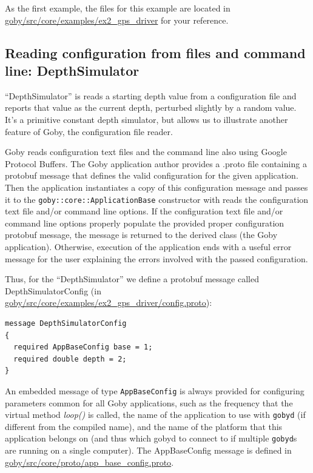 \documentclass[11pt, letterpaper]{article}
\begin{document}
As the first example, the files for this example are located in \href{http://bazaar.launchpad.net/~goby-dev/goby/trunk/files/head:/src/core/examples/ex2_gps_driver}{goby/src/core/examples/ex2\_gps\_driver} for your reference. 

\subsection{Reading configuration from files and command line: DepthSimulator}

``DepthSimulator'' is reads a starting depth value from a configuration file and reports that value as the current depth, perturbed slightly by a random value. It's a primitive constant depth simulator, but allows us to illustrate another feature of Goby, the configuration file reader.

Goby reads configuration text files and the command line also using Google Protocol Buffers. The Goby application author provides a .proto file containing a protobuf message that defines the valid configuration for the given application. Then the application instantiates a copy of this configuration message and passes it to the \texttt{goby::core::ApplicationBase} constructor with reads the configuration text file and/or command line options. If the configuration text file and/or command line options properly populate the provided proper configuration protobuf message, the message is returned to the derived class (the Goby application). Otherwise, execution of the application ends with a useful error message for the user explaining the errors involved with the passed configuration. 

Thus, for the ``DepthSimulator'' we define a protobuf message called DepthSimulatorConfig (in \href{http://bazaar.launchpad.net/~goby-dev/goby/trunk/annotate/head:/src/core/examples/ex2_gps_driver/config.proto}{goby/src/core/examples/ex2\_gps\_driver/config.proto}):

\begin{verbatim}
message DepthSimulatorConfig
{
  required AppBaseConfig base = 1;
  required double depth = 2;
}
\end{verbatim}

An embedded message of type \texttt{AppBaseConfig} is always provided for configuring parameters common for all Goby applications, such as the frequency that the virtual method \textit{loop()} is called, the name of the application to use with \texttt{gobyd} (if different from the compiled name), and the name of the platform that this application belongs on (and thus which gobyd to connect to if multiple \texttt{gobyd}s are running on a single computer). The AppBaseConfig message is defined in \href{http://bazaar.launchpad.net/~goby-dev/goby/trunk/annotate/head:/src/core/proto/app_base_config.proto}{goby/src/core/proto/app\_base\_config.proto}.
\end{document}
